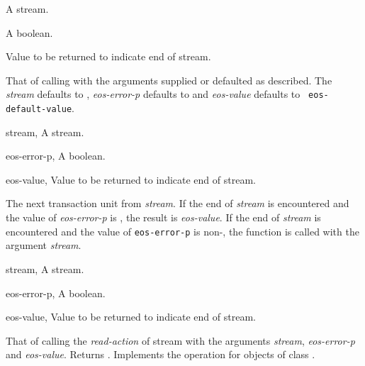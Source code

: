 \begin{optDefinition}
\begin{arguments}
    \item[\optional{stream}] A stream.
    \item[\optional{eos-error-p}] A boolean.
    \item[\optional{eos-value}] Value to be returned to indicate end of stream.
\end{arguments}
%
\result%
That of calling  with the arguments supplied or
defaulted as described.
%
\remarks%
The {\em stream\/} defaults to , {\em
    eos-error-p\/} defaults to \nil\/ and {\em eos-value\/} defaults to {\tt
    eos-default-value}.

\begin{genericargs}
    \item[stream, \classref{stream}] A stream.
    \item[eos-error-p, \classref{object}] A boolean.
    \item[eos-value, \classref{object}] Value to be returned to indicate end of
    stream.
\end{genericargs}
%
\result%
The next transaction unit from {\em stream}.
%
\remarks%
If the end of {\em stream\/} is encountered and the value of {\em eos-error-p}
is \nil, the result is {\em eos-value\/}. If the end of {\em stream} is
encountered and the value of {\tt eos-error-p} is non-\nil, the function
 is called with the argument {\em stream}.

\begin{specargs}
    \item[stream, \classref{stream}] A stream.
    \item[eos-error-p, \classref{object}] A boolean.
    \item[eos-value, \classref{object}] Value to be returned to indicate end of
    stream.
\end{specargs}
%
\result%
That of calling the {\em read-action\/} of stream with the arguments {\em stream\/},
{\em eos-error-p\/} and {\em eos-value}.  Returns \true.
%
\remarks%
Implements the  operation for objects of class
.


\end{optDefinition}
